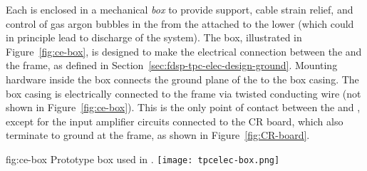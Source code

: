 Each  is enclosed in a mechanical \textit{ box} to provide support, cable strain
relief, and control of gas argon bubbles in the \lar from the  attached to the lower 
(which could in principle lead to discharge of the  system).
The  box, illustrated in Figure~\ref{fig:ce-box}, is designed to make the electrical connection 
between the  and the  frame, as defined in Section~\ref{sec:fdsp-tpc-elec-design-ground}.
Mounting hardware inside the  box connects the ground plane of the  to the box casing. The
box casing is electrically connected to the  frame via twisted conducting wire (not 
shown in Figure~\ref{fig:ce-box}). This is the only point of contact between the  and
, except for the input amplifier circuits connected to the CR board, which also terminate to
ground at the  frame, as shown in Figure~\ref{fig:CR-board}.

\begin{dunefigure}
{fig:ce-box}
{Prototype  box used in .}
\texttt{[image: tpcelec-box.png]}
\end{dunefigure}

